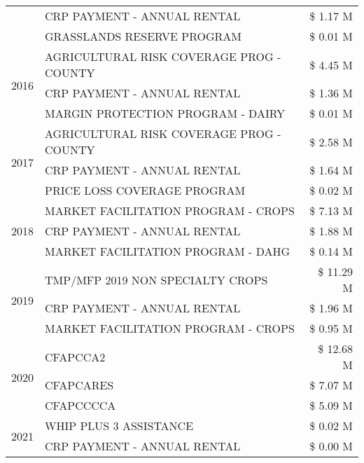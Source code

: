 \begin{tabular}{llr}
 & CRP PAYMENT - ANNUAL RENTAL & \$ 1.17 M \\
 & GRASSLANDS RESERVE PROGRAM & \$ 0.01 M \\
\cline{1-3}
\multirow[t]{3}{*}{2016} & AGRICULTURAL RISK COVERAGE PROG - COUNTY & \$ 4.45 M \\
 & CRP PAYMENT - ANNUAL RENTAL & \$ 1.36 M \\
 & MARGIN PROTECTION PROGRAM - DAIRY & \$ 0.01 M \\
\cline{1-3}
\multirow[t]{3}{*}{2017} & AGRICULTURAL RISK COVERAGE PROG - COUNTY & \$ 2.58 M \\
 & CRP PAYMENT - ANNUAL RENTAL & \$ 1.64 M \\
 & PRICE LOSS COVERAGE PROGRAM & \$ 0.02 M \\
\cline{1-3}
\multirow[t]{3}{*}{2018} & MARKET FACILITATION PROGRAM - CROPS & \$ 7.13 M \\
 & CRP PAYMENT - ANNUAL RENTAL & \$ 1.88 M \\
 & MARKET FACILITATION PROGRAM - DAHG & \$ 0.14 M \\
\cline{1-3}
\multirow[t]{3}{*}{2019} & TMP/MFP 2019 NON SPECIALTY CROPS & \$ 11.29 M \\
 & CRP PAYMENT - ANNUAL RENTAL & \$ 1.96 M \\
 & MARKET FACILITATION PROGRAM - CROPS & \$ 0.95 M \\
\cline{1-3}
\multirow[t]{3}{*}{2020} & CFAPCCA2 & \$ 12.68 M \\
 & CFAPCARES & \$ 7.07 M \\
 & CFAPCCCCA & \$ 5.09 M \\
\cline{1-3}
\multirow[t]{2}{*}{2021} & WHIP PLUS 3 ASSISTANCE & \$ 0.02 M \\
 & CRP PAYMENT - ANNUAL RENTAL & \$ 0.00 M \\
\cline{1-3}
\bottomrule
\end{tabular}

